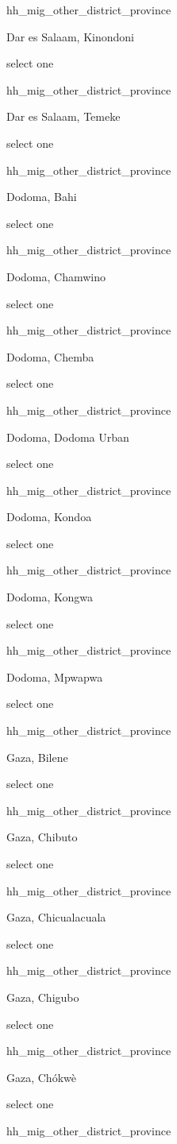 \documentclass[]{article}
\begin{document}
hh\_mig\_other\_district\_province

Dar es Salaam, Kinondoni

select one

hh\_mig\_other\_district\_province

Dar es Salaam, Temeke

select one

hh\_mig\_other\_district\_province

Dodoma, Bahi

select one

hh\_mig\_other\_district\_province

Dodoma, Chamwino

select one

hh\_mig\_other\_district\_province

Dodoma, Chemba

select one

hh\_mig\_other\_district\_province

Dodoma, Dodoma Urban

select one

hh\_mig\_other\_district\_province

Dodoma, Kondoa

select one

hh\_mig\_other\_district\_province

Dodoma, Kongwa

select one

hh\_mig\_other\_district\_province

Dodoma, Mpwapwa

select one

hh\_mig\_other\_district\_province

Gaza, Bilene

select one

hh\_mig\_other\_district\_province

Gaza, Chibuto

select one

hh\_mig\_other\_district\_province

Gaza, Chicualacuala

select one

hh\_mig\_other\_district\_province

Gaza, Chigubo

select one

hh\_mig\_other\_district\_province

Gaza, Chókwè

select one

hh\_mig\_other\_district\_province
\end{document}
